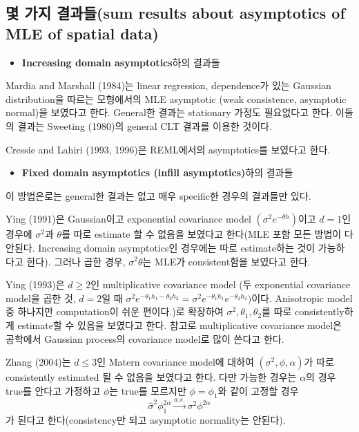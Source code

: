 \documentclass[b5paper,]{scrbook}
\providecommand{\tightlist}{%
  \setlength{\itemsep}{0pt}\setlength{\parskip}{0pt}}
\theoremstyle{plain}
\theoremstyle{definition}
\numberwithin{equation}{section}
\begin{document}
\subsection{몇 가지 결과들(sum results about asymptotics of MLE of
spatial
data)}\label{--sum-results-about-asymptotics-of-mle-of-spatial-data}

\begin{itemize}
\tightlist
\item
  \textbf{Increasing domain asymptotics}하의 결과들
\end{itemize}

Mardia and Marshall (1984)는 linear regression, dependence가 있는
Gaussian distribution을 따르는 모형에서의 MLE asymptotic (weak
consistence, asymptotic normal)을 보였다고 한다. General한 결과는
stationary 가정도 필요없다고 한다. 이들의 결과는 Sweeting (1980)의
general CLT 결과를 이용한 것이다.

Cressie and Lahiri (1993, 1996)은 REML에서의 asymptotics를 보였다고
한다.

\begin{itemize}
\tightlist
\item
  \textbf{Fixed domain asymptotics (infill asymptotics)}하의 결과들
\end{itemize}

이 방법은로는 general한 결과는 없고 매우 specific한 경우의 결과들만
있다.

Ying (1991)은 Gaussian이고 exponential covariance model
\((\sigma^{2}e^{-\theta h})\)이고 \(d=1\)인 경우에 \(\sigma^{2}\)과
\(\theta\)를 따로 estimate 할 수 없음을 보였다고 한다(MLE 포함 모든
방법이 다 안된다. Increasing domain asymptotics인 경우에는 따로
estimate하는 것이 가능하다고 한다). 그러나 곱한 경우,
\(\sigma^{2}\theta\)는 MLE가 consistent함을 보였다고 한다.

Ying (1993)은 \(d \geq 2\)인 multiplicative covariance model (두
exponential covariance model을 곱한 것, \(d=2\)일 때
\(\sigma^{2}e^{-\theta_{1} h_{1}-\theta_{2}h_{2}}=\sigma^{2}e^{-\theta_{1}h_{1}}e^{-\theta_{2}h_{2}})\)이다.
Anisotropic model 중 하나지만 computation이 쉬운 편이다.)로 확장하여
\(\sigma^{2}, \theta_{1}, \theta_{2}\)를 따로 consistently하게
estimate할 수 있음을 보였다고 한다. 참고로 multiplicative covariance
model은 공학에서 Gaussian process의 covariance model로 많이 쓴다고 한다.

Zhang (2004)는 \(d \leq 3\)인 Matern covariance model에 대하여
\((\sigma^{2}, \phi, \alpha)\)가 따로 consistently estimated 될 수
없음을 보였다고 한다. 다만 가능한 경우는 \(\alpha\)의 경우 true를 안다고
가정하고 \(\phi\)는 true를 모르지만 \(\phi=\phi_{1}\)와 같이 고정할 경우
\[\hat{\sigma}^{2}\phi_{1}^{2\alpha} \stackrel{a.s.}{\rightarrow} \sigma^{2}\phi^{2\alpha}\]
가 된다고 한다(consistency만 되고 asymptotic normality는 안된다).
\end{document}
